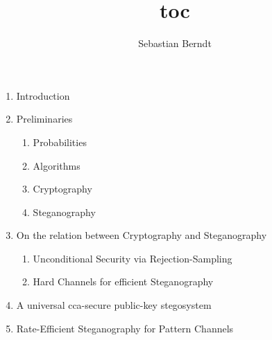 \documentclass[german,table]{scrartcl}
\title{toc}
\author{Sebastian Berndt}
\date{}
\theoremstyle{plain}
\theoremstyle{definition}
\begin{document}
\begin{enumerate}
\item Introduction
\item Preliminaries
  \begin{enumerate}
  \item Probabilities
  \item Algorithms
  \item Cryptography
  \item Steganography
  \end{enumerate}
\item On the relation between Cryptography and Steganography
  \begin{enumerate}
  \item Unconditional Security via Rejection-Sampling
  \item Hard Channels for efficient Steganography
  \end{enumerate}
\item A universal cca-secure public-key stegosystem
\item Rate-Efficient Steganography for Pattern Channels
\end{enumerate}
\end{document}
